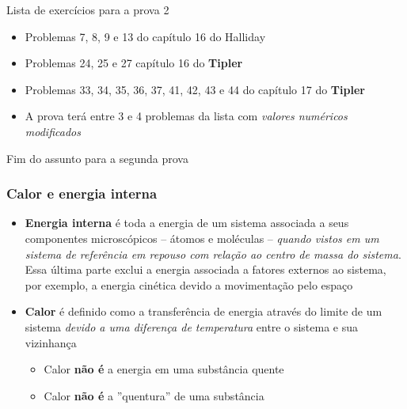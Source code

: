 \documentclass[t,%
brazilian,%
11pt,%
aspectratio=169,%
table%
]{beamer}
\begin{document}
\begin{frame}{Lista de exercícios para a prova 2}
    \begin{itemize}
        \item Problemas 7, 8, 9 e 13 do capítulo 16 do Halliday
        \item Problemas 24, 25 e 27 capítulo 16 do \textbf{Tipler}
        \item Problemas  33, 34, 35, 36, 37, 41, 42, 43 e 44 do capítulo 17 do \textbf{Tipler}
        \item A prova terá entre 3 e 4 problemas da lista com \textit{valores
            numéricos modificados}
    \end{itemize}
\end{frame}

\begin{frame}[c]
    \centering
    Fim do assunto para a segunda prova
\end{frame}

\begin{frame}
    \frametitle{Calor e energia interna}
    \begin{itemize}
        \item \textbf{Energia interna} é toda a energia de um sistema associada
            a seus componentes microscópicos -- átomos e moléculas --
            \textit{quando vistos em um sistema de referência em repouso com
            relação ao centro de massa do sistema}. Essa última parte exclui a
            energia associada a fatores externos ao sistema, por exemplo, a
            energia cinética devido a movimentação pelo espaço

        \item \textbf{Calor} é definido como a transferência de energia através
            do limite de um sistema \textit{devido a uma diferença de
            temperatura} entre o sistema e sua vizinhança

            \begin{itemize}
                \item Calor \textbf{não é} a energia em uma substância quente
                \item Calor \textbf{não é} a ''quentura'' de uma substância
            \end{itemize}
    \end{itemize}
\end{frame}
\end{document}
